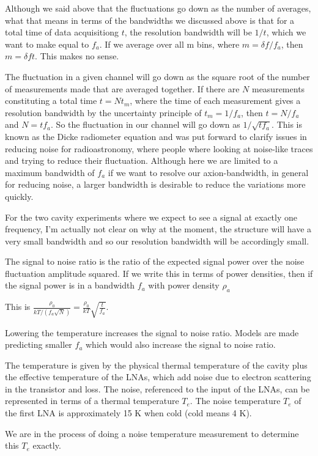 \documentclass[11pt]{article}
\begin{document}
Although we said above that the fluctuations go down as the number of averages, what that means in terms of the bandwidths we discussed above is that for a total time of data acquisitiong $t$, the resolution bandwidth will be $1/t$, which we want to make equal to $f_a$. If we average over all m bins, where $m=\delta f/f_a$, then $m =\delta f t$. This makes no sense.

The fluctuation in a given channel will go down as the square root of the number of measurements made that are averaged together. If there are $N$ measurements constituting a total time $t=Nt_m$, where the time of each measurement gives a resolution bandwidth by the uncertainty principle of $t_m=1/f_a$, then $t=N/f_a$ and $N=tf_a$. So the fluctuation in our channel will go down as $1/\sqrt{t f_a}$. This is known as the Dicke radiometer equation and was put forward to clarify issues in reducing noise for radioastronomy, where people where looking at noise-like traces and trying to reduce their fluctuation. Although here we are limited to a maximum bandwidth of $f_a$ if we want to resolve our axion-bandwidth, in general for reducing noise, a larger bandwidth is desirable to reduce the variations more quickly.

For the two cavity experiments where we expect to see a signal at exactly one frequency, I'm actually not clear on why at the moment, the structure will have a very small bandwidth and so our resolution bandwidth will be accordingly small.

The signal to noise ratio is the ratio of the expected signal power over the noise fluctuation amplitude squared. If we write this in terms of power densities, then if the signal power is in a bandwidth $f_a$ with power density $\rho_a$

This is $\frac{\rho_0}{kT/(f_a\sqrt{N})} = \frac{\rho_0}{kT}\sqrt{\frac{t}{f_a}} $.

Lowering the temperature increases the signal to noise ratio. Models are made predicting smaller $f_a$ which would also increase the signal to noise ratio.

The temperature is given by the physical thermal temperature of the cavity plus the effective temperature of the LNAs, which add noise due to electron scattering in the transistor and loss. The noise, referenced to the input of the LNAs, can be represented in terms of a thermal temperature $T_e$. The noise temperature $T_e$ of the first LNA is approximately 15 K when cold (cold means 4 K).

We are in the process of doing a noise temperature measurement to determine this $T_e$ exactly.
\end{document}

